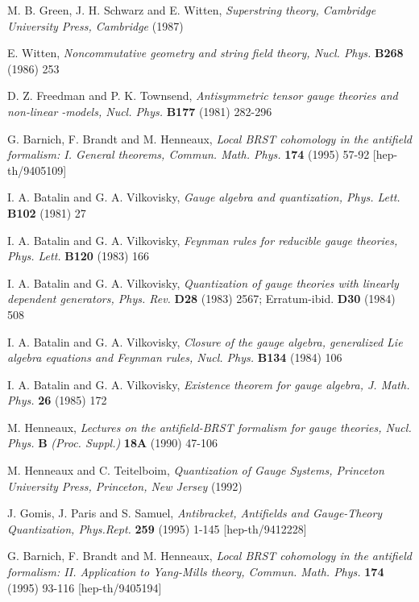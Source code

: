 \documentclass[a4paper,12pt]{article}
\begin{document}
\begin{thebibliography}{99}
  M. B. Green, J. H. Schwarz and E. Witten, \textit{%
Superstring theory, Cambridge University Press, Cambridge} (1987)

  E. Witten, \textit{Noncommutative geometry and string
field theory, Nucl. Phys.} \textbf{B268} (1986) 253

  D. Z. Freedman and P. K. Townsend, \textit{Antisymmetric
tensor gauge theories and non-linear }\myHighlight{$\sigma $}\coordHE{}\textit{-models, Nucl. Phys.} 
\textbf{B177} (1981) 282-296

  G. Barnich, F. Brandt and M. Henneaux, \textit{Local BRST
cohomology in the antifield formalism: I. General theorems, Commun. Math.
Phys.} \textbf{174} (1995) 57-92 [hep-th/9405109]

  I. A. Batalin and G. A. Vilkovisky, \textit{Gauge algebra
and quantization, Phys. Lett.} \textbf{B102} (1981) 27

  I. A. Batalin and G. A. Vilkovisky, \textit{Feynman rules
for reducible gauge theories, Phys. Lett.} \textbf{B120} (1983) 166

  I. A. Batalin and G. A. Vilkovisky, \textit{Quantization of
gauge theories with linearly dependent generators, Phys. Rev.} \textbf{D28}
(1983) 2567; Erratum-ibid. \textbf{D30} (1984) 508

  I. A. Batalin and G. A. Vilkovisky, \textit{Closure of the
gauge algebra, generalized Lie algebra equations and Feynman rules, Nucl.
Phys.} \textbf{B134} (1984) 106

  I. A. Batalin and G. A. Vilkovisky, \textit{Existence
theorem for gauge algebra, J. Math. Phys.} \textbf{26} (1985) 172

  M. Henneaux, \textit{Lectures on the antifield-BRST
formalism for gauge theories, Nucl. Phys.} \textbf{B} \textit{(Proc. Suppl.)}
\textbf{18A} (1990) 47-106

  M. Henneaux and C. Teitelboim, \textit{Quantization of
Gauge Systems, Princeton University Press, Princeton, New Jersey} (1992)

  J. Gomis, J. Paris and S. Samuel, \textit{Antibracket,
Antifields and Gauge-Theory Quantization, Phys.Rept.} \textbf{259} (1995)
1-145 [hep-th/9412228]

  G. Barnich, F. Brandt and M. Henneaux, \textit{Local BRST
cohomology in the antifield formalism: II. Application to Yang-Mills theory,
Commun. Math. Phys.} \textbf{174} (1995) 93-116 [hep-th/9405194]
\end{thebibliography}
\end{document}
